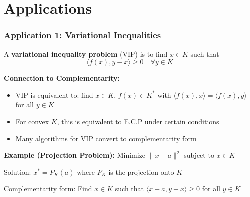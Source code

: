 \documentclass[aspectratio=169,10pt]{beamer}
\begin{document}
\section{Applications}

\begin{frame}
\frametitle{Application 1: Variational Inequalities}

\begin{definition}
A \textbf{variational inequality problem} (VIP) is to find $x \in K$ such that
$$\langle f(x), y - x \rangle \geq 0 \quad \forall y \in K$$
\end{definition}

\vspace{0.3cm}

\textbf{Connection to Complementarity:}
\begin{itemize}
    \item VIP is equivalent to: find $x \in K$, $f(x) \in K^*$ with $\langle f(x), x \rangle = \langle f(x), y \rangle$ for all $y \in K$
    \item For convex $K$, this is equivalent to E.C.P under certain conditions
    \item Many algorithms for VIP convert to complementarity form
\end{itemize}

\vspace{0.3cm}

\textbf{Example (Projection Problem):}
Minimize $\|x - a\|^2$ subject to $x \in K$

Solution: $x^* = P_K(a)$ where $P_K$ is the projection onto $K$

Complementarity form: Find $x \in K$ such that $\langle x - a, y - x \rangle \geq 0$ for all $y \in K$

\end{frame}
\end{document}
